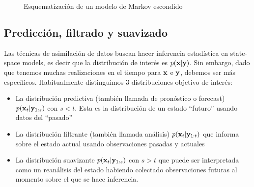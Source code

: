 \begin{figure}[h]
    \centering
    \caption{Esquematización de un modelo de Markov escondido} \label{dia:hmm}
\end{figure}

\subsection{Predicción, filtrado y suavizado}

Las técnicas de asimilación de datos buscan hacer inferencia estadística en state-space models, es decir que la distribución de interés es $p(\mathbf{x} | \mathbf{y})$. Sin embargo, dado que tenemos muchas realizaciones en el tiempo para $\mathbf{x}$ e $\mathbf{y}$, debemos ser más específicos. Habitualmente distinguimos 3 distribuciones objetivo de interés:
\begin{itemize}
    \item La distribución predictiva (también llamada de pronóstico o forecast) $p(\mathbf{x}_t | \mathbf{y}_{1:s})$ con $s < t$. Esta es la distribución de un estado ``futuro'' usando datos del ``pasado''
    \item La distribución filtrante (también llamada análisis) $p(\mathbf{x}_t | \mathbf{y}_{1:t})$ que informa sobre el estado actual usando observaciones pasadas y actuales
    \item La distribución suavizante $p(\mathbf{x}_t | \mathbf{y}_{1:s})$ con $s > t$ que puede ser interpretada como un reanálisis del estado habiendo colectado observaciones futuras al momento sobre el que se hace inferencia.
\end{itemize}

